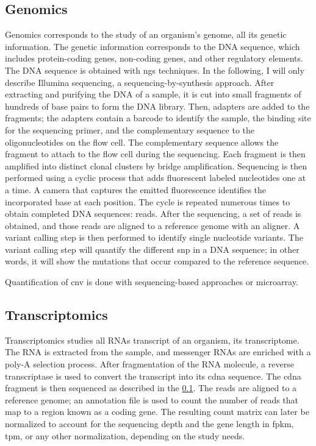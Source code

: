 \documentclass[../main.tex]{subfiles}
\begin{document}
	\subsection{Genomics}\label{subsec:genomics}
		Genomics corresponds to the study of an organism's genome, \ie{}all its genetic information.
		The genetic information corresponds to the DNA sequence, which includes protein-coding genes, non-coding genes, and other regulatory elements.
		The DNA sequence is obtained with \gls{ngs} techniques.
		In the following, I will only describe Illumina sequencing, a sequencing-by-synthesis approach.
		After extracting and purifying the DNA of a sample, it is cut into small fragments of hundreds of base pairs to form the DNA library.
		Then, adapters are added to the fragments; the adapters contain a barcode to identify the sample, the binding site for the sequencing primer, and the complementary sequence to the oligonucleotides on the flow cell.
		The complementary sequence allows the fragment to attach to the flow cell during the sequencing.
		Each fragment is then amplified into distinct clonal clusters by bridge amplification.
		Sequencing is then performed using a cyclic process that adds fluorescent labeled nucleotides one at a time.
		A camera that captures the emitted fluorescence identifies the incorporated base at each position.
		The cycle is repeated numerous times to obtain completed DNA sequences: reads.
		After the sequencing, a set of reads is obtained, and those reads are aligned to a reference genome with an aligner.
		A variant calling step is then performed to identify single nucleotide variants.
		The variant calling step will quantify the different \gls{snp} in a DNA sequence; in other words, it will show the mutations that occur compared to the reference sequence.

		Quantification of \gls{cnv} is done with sequencing-based approaches or microarray.

	\subsection{Transcriptomics}\label{subsec:transcriptomics}
		Transcriptomics studies all RNAs transcript of an organism, \ie{}its transcriptome.
		The RNA is extracted from the sample, and messenger RNAs are enriched with a poly-A selection process.
		After fragmentation of the RNA molecule, a reverse transcriptase is used to convert the transcript into its \gls{cdna} sequence.
		The \gls{cdna} fragment is then sequenced as described in the \cref{subsec:genomics}.
		The reads are aligned to a reference genome; an annotation file is used to count the number of reads that map to a region known as a coding gene.
		The resulting count matrix can later be normalized to account for the sequencing depth and the gene length in \gls{fpkm}, \gls{tpm}, or any other normalization, depending on the study needs.
\end{document}
